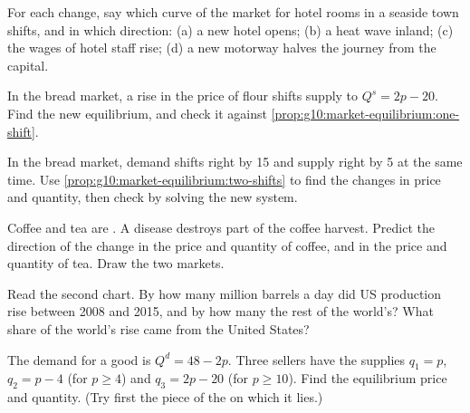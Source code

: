\begin{exercise}[$\star$]\label{exo:g10:market-equilibrium:5}
For each change, say which curve of the market for hotel rooms in a seaside town shifts, and in which direction: (a) a new hotel opens;
(b) a heat wave inland; (c) the wages of hotel staff rise; (d) a new motorway halves the journey from the capital.
\end{exercise}

\begin{exercise}[$\star\star$]\label{exo:g10:market-equilibrium:6}
In the bread market, a rise in the price of flour shifts supply to $Q^s = 2p - 20$. Find the new equilibrium, and check it against
\cref{prop:g10:market-equilibrium:one-shift}.
\end{exercise}

\begin{exercise}[$\star\star$]\label{exo:g10:market-equilibrium:7}
In the bread market, demand shifts right by 15 and supply right by 5 at the same time. Use \cref{prop:g10:market-equilibrium:two-shifts} to
find the changes in price and quantity, then check by solving the new system.
\end{exercise}

\begin{exercise}[$\star\star$]\label{exo:g10:market-equilibrium:8}
Coffee and tea are . A disease destroys part of the coffee harvest. Predict the direction of the change in the price and quantity of
coffee, and in the price and quantity of tea. Draw the two markets.
\end{exercise}

\begin{exercise}[$\star\star$]\label{exo:g10:market-equilibrium:9}
Read the second chart. By how many million barrels a day did US production rise between 2008 and 2015, and by how many the rest of the world's?
What share of the world's rise came from the United States?
\end{exercise}

\begin{exercise}[$\star\star$]\label{exo:g10:market-equilibrium:10}
The demand for a good is $Q^d = 48 - 2p$. Three sellers have the supplies $q_1 = p$, $q_2 = p - 4$ (for $p \ge 4$) and $q_3 = 2p - 20$ (for $p \ge
10$). Find the equilibrium price and quantity. (Try first the piece of the  on which it lies.)
\end{exercise}

